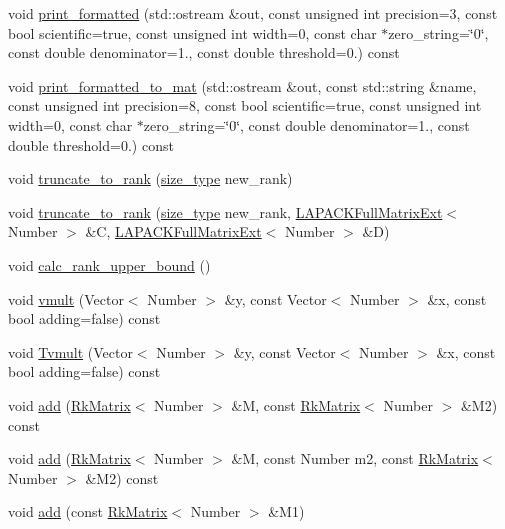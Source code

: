\begin{DoxyCompactItemize}
\item 
void \hyperlink{classRkMatrix_aeccb86734649be94a64d76cb613eea79}{print\+\_\+formatted} (std\+::ostream \&out, const unsigned int precision=3, const bool scientific=true, const unsigned int width=0, const char $\ast$zero\+\_\+string=\char`\"{}0\char`\"{}, const double denominator=1., const double threshold=0.) const
\item 
void \hyperlink{classRkMatrix_ada4d32bb08cce5d5e41ee4673bc88e00}{print\+\_\+formatted\+\_\+to\+\_\+mat} (std\+::ostream \&out, const std\+::string \&name, const unsigned int precision=8, const bool scientific=true, const unsigned int width=0, const char $\ast$zero\+\_\+string=\char`\"{}0\char`\"{}, const double denominator=1., const double threshold=0.) const
\item 
void \hyperlink{classRkMatrix_a555e0c3184b8411db1350c8fe1e875a0}{truncate\+\_\+to\+\_\+rank} (\hyperlink{classRkMatrix_add060bfc3a4cc77f858c3d6dd58cadd5}{size\+\_\+type} new\+\_\+rank)
\item 
void \hyperlink{classRkMatrix_adbaf1dad03ca2fe0ede5bab2315d8859}{truncate\+\_\+to\+\_\+rank} (\hyperlink{classRkMatrix_add060bfc3a4cc77f858c3d6dd58cadd5}{size\+\_\+type} new\+\_\+rank, \hyperlink{classLAPACKFullMatrixExt}{L\+A\+P\+A\+C\+K\+Full\+Matrix\+Ext}$<$ Number $>$ \&C, \hyperlink{classLAPACKFullMatrixExt}{L\+A\+P\+A\+C\+K\+Full\+Matrix\+Ext}$<$ Number $>$ \&D)
\item 
void \hyperlink{classRkMatrix_ab41155389e6ee81d5f127514ca3166b4}{calc\+\_\+rank\+\_\+upper\+\_\+bound} ()
\item 
void \hyperlink{classRkMatrix_a25753b7f6d82dca931992cd975165972}{vmult} (Vector$<$ Number $>$ \&y, const Vector$<$ Number $>$ \&x, const bool adding=false) const
\item 
void \hyperlink{classRkMatrix_a7162dd0c4580dbb5e98715d9b8dd56c1}{Tvmult} (Vector$<$ Number $>$ \&y, const Vector$<$ Number $>$ \&x, const bool adding=false) const
\item 
void \hyperlink{classRkMatrix_a260584004c862292b4ae401cff236588}{add} (\hyperlink{classRkMatrix}{Rk\+Matrix}$<$ Number $>$ \&M, const \hyperlink{classRkMatrix}{Rk\+Matrix}$<$ Number $>$ \&M2) const
\item 
void \hyperlink{classRkMatrix_a99413509ad44b1529f20cb018ce0fc70}{add} (\hyperlink{classRkMatrix}{Rk\+Matrix}$<$ Number $>$ \&M, const Number m2, const \hyperlink{classRkMatrix}{Rk\+Matrix}$<$ Number $>$ \&M2) const
\item 
void \hyperlink{classRkMatrix_a8793188eb93def0030ae90e8f5898813}{add} (const \hyperlink{classRkMatrix}{Rk\+Matrix}$<$ Number $>$ \&M1)

\end{DoxyCompactItemize}
